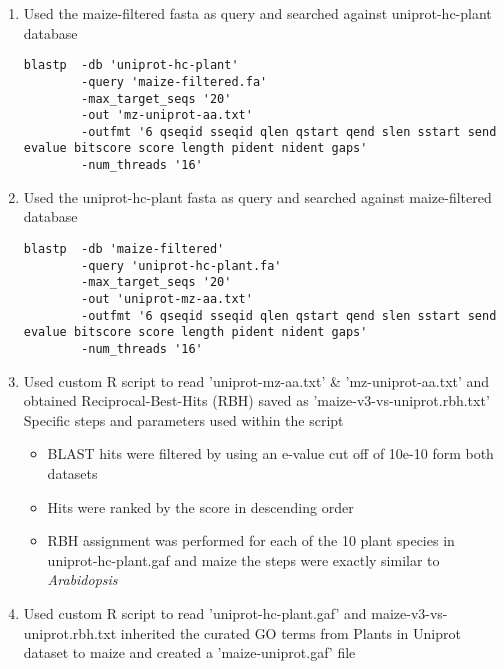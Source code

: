 \begin{enumerate}
\begin{enumerate}
      \item Used the maize-filtered fasta as query and searched against uniprot-hc-plant database
      \begin{verbatim}
blastp  -db 'uniprot-hc-plant'
        -query 'maize-filtered.fa'
        -max_target_seqs '20'
        -out 'mz-uniprot-aa.txt'
        -outfmt '6 qseqid sseqid qlen qstart qend slen sstart send evalue bitscore score length pident nident gaps'
        -num_threads '16'
      \end{verbatim}
      \item Used the uniprot-hc-plant fasta as query and searched against maize-filtered database
      \begin{verbatim}
blastp  -db 'maize-filtered'
        -query 'uniprot-hc-plant.fa'
        -max_target_seqs '20'
        -out 'uniprot-mz-aa.txt'
        -outfmt '6 qseqid sseqid qlen qstart qend slen sstart send evalue bitscore score length pident nident gaps'
        -num_threads '16'
      \end{verbatim}
      \item Used custom R script to read 'uniprot-mz-aa.txt' \& 'mz-uniprot-aa.txt' and obtained Reciprocal-Best-Hits (RBH) saved as 'maize-v3-vs-uniprot.rbh.txt' \\
          Specific steps and parameters used within the script
        \begin{itemize}
          \item BLAST hits were filtered by using an e-value cut off of 10e-10 form both datasets
          \item Hits were ranked by the score in descending order
          \item RBH assignment was performed for each of the 10 plant species in uniprot-hc-plant.gaf and maize the steps were exactly similar to \emph{Arabidopsis}
        \end{itemize}
      \item Used custom R script to read 'uniprot-hc-plant.gaf' and maize-v3-vs-uniprot.rbh.txt inherited the curated GO terms from Plants in Uniprot dataset to maize and created a 'maize-uniprot.gaf' file
    \end{enumerate}
  \end{enumerate}

